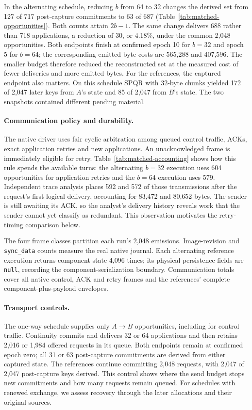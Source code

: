 In the alternating schedule, reducing $b$ from 64 to 32 changes the derived
set from 127 of 717 post-capture commitments to 63 of 687
(Table~\ref{tab:matched-opportunities}). Both counts attain $2b-1$.
The same change delivers 688 rather than 718 applications, a reduction of
30, or 4.18\%, under the common 2,048 opportunities. Both endpoints finish
at confirmed epoch 10 for $b=32$ and epoch 5 for $b=64$; the corresponding
emitted-byte costs are 565,288 and 407,596.
The smaller budget therefore reduced the reconstructed set at the measured
cost of fewer deliveries and more emitted bytes. For the references,
the captured endpoint also matters. On this schedule SPQR with 32-byte
chunks yielded 172 of 2,047 later keys from $A$'s state and 85 of 2,047
from $B$'s state.
The two snapshots contained different pending material.

\paragraph{Communication policy and durability.}
The native driver uses fair cyclic arbitration among queued control traffic,
ACKs, exact application retries and new applications. An unacknowledged frame
is immediately eligible for retry. Table~\ref{tab:matched-accounting} shows
how this rule spends the available turns: the alternating $b=32$ execution
uses 604 opportunities for application retries and the $b=64$ execution
uses 579. Independent trace analysis places 592 and 572 of those
transmissions after the request's first logical delivery, accounting for
83,472 and 80,652 bytes. The sender is still awaiting its ACK, so the
analyst's delivery history reveals work that the sender cannot yet classify
as redundant. This observation motivates the retry-timing comparison below.

The four frame classes partition each run's 2,048 emissions. Image-revision
and \texttt{sync\_data} counts measure the real native journal. Each
alternating reference execution returns component state 4,096 times;
its physical persistence fields are \texttt{null}, recording the
component-serialization boundary. Communication totals cover all native
control, ACK and retry frames and the references' complete
component-plus-payload envelopes.

\paragraph{Transport controls.}
The one-way schedule supplies only $A\!\to\!B$ opportunities, including for
control traffic. Continuity commits and delivers 32 or 64 applications and
then retains 2,016 or 1,984 offered requests in its queue. Both endpoints
remain at confirmed epoch zero; all 31 or 63 post-capture commitments are
derived from either captured state. The references continue committing
2,048 requests, with 2,047 of 2,047 post-capture keys derived. This control
shows where the send budget stops new commitments and how many requests
remain queued. For schedules with renewed exchange, we assess recovery
through the later allocations and their original sources.

